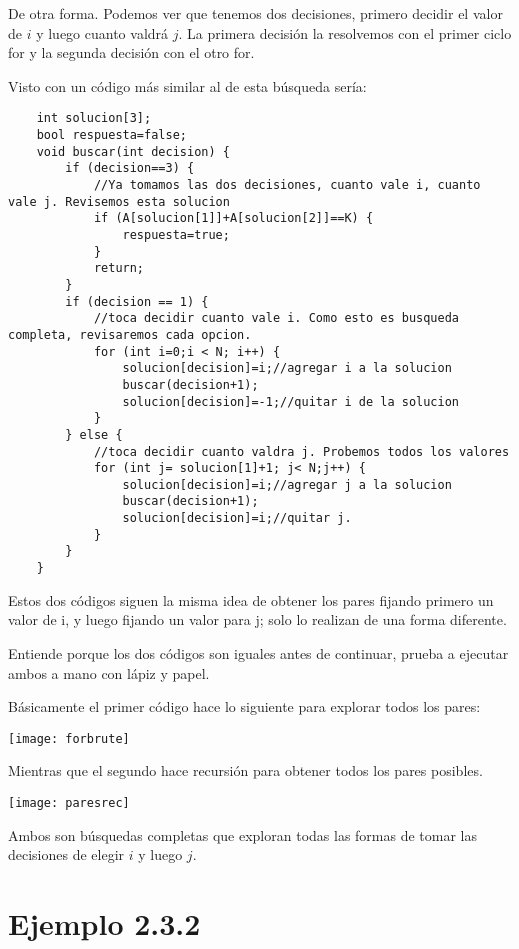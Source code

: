 De otra forma. Podemos ver que tenemos dos decisiones, primero decidir el valor de \(i\) y luego cuanto valdrá \(j\). La primera decisión la resolvemos con el primer ciclo for y la segunda decisión con el otro for.

Visto con un código más similar al de esta búsqueda sería:

\pagebreak

\begin{lstlisting}
	int solucion[3];
	bool respuesta=false;
	void buscar(int decision) {
		if (decision==3) {
			//Ya tomamos las dos decisiones, cuanto vale i, cuanto vale j. Revisemos esta solucion
			if (A[solucion[1]]+A[solucion[2]]==K) {
				respuesta=true;
			}
			return;
		}
		if (decision == 1) {
			//toca decidir cuanto vale i. Como esto es busqueda completa, revisaremos cada opcion.
			for (int i=0;i < N; i++) {
				solucion[decision]=i;//agregar i a la solucion
				buscar(decision+1);	
				solucion[decision]=-1;//quitar i de la solucion
			}
		} else {
			//toca decidir cuanto valdra j. Probemos todos los valores
			for (int j= solucion[1]+1; j< N;j++) {				
				solucion[decision]=i;//agregar j a la solucion
				buscar(decision+1);
				solucion[decision]=i;//quitar j.
			}
		}
	}
\end{lstlisting}

Estos dos códigos siguen la misma idea de obtener los pares fijando primero un valor de i, y  luego fijando un valor para j; solo lo realizan de una forma diferente.

Entiende porque los dos códigos son iguales antes de continuar, prueba a ejecutar ambos a mano con lápiz y papel.

Básicamente el primer código hace lo siguiente para explorar todos los pares:
\begin{center}
	\texttt{[image: forbrute]}
\end{center}

Mientras que el segundo hace recursión para obtener todos los pares posibles.

\begin{center}
	\texttt{[image: paresrec]}
\end{center}

Ambos son búsquedas completas que exploran todas las formas de tomar las decisiones de elegir \(i\) y luego \(j\).

\section*{Ejemplo 2.3.2}

